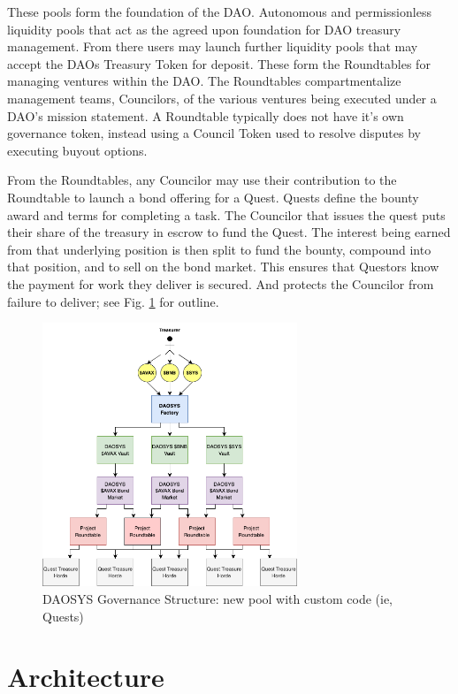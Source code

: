 \documentclass[journal,twocolumn,12pt]{ieeesyscoin}
\begin{document}
These pools form the foundation of the DAO. Autonomous and permissionless liquidity pools that act as the agreed upon foundation for DAO treasury management. From there users may launch further liquidity pools that may accept the DAOs Treasury Token for deposit. These form the Roundtables for managing ventures within the DAO. The Roundtables compartmentalize management teams, Councilors, of the various ventures being executed under a DAO’s mission statement. A Roundtable typically does not have it’s own governance token, instead using a Council Token used to resolve disputes by executing buyout options.

From the Roundtables, any Councilor may use their contribution to the Roundtable to launch a bond offering for a Quest. Quests define the bounty award and terms for completing a task. The Councilor that issues the quest puts their share of the treasury in escrow to fund the Quest. The interest being earned from that underlying position is then split to fund the bounty, compound into that position, and to sell on the bond market. This ensures that Questors know the payment for work they deliver is secured. And protects the Councilor from failure to deliver; see Fig. \ref{fig:daosys_governance} for outline.

\begin{figure}[h!]
\includegraphics[width=3in]{img/governance.png}
\caption{DAOSYS Governance Structure: new pool with custom code (ie, Quests)} 
\label{fig:daosys_governance}
\end{figure} 

\section{Architecture}
\label{sec:architecture}
\end{document}
